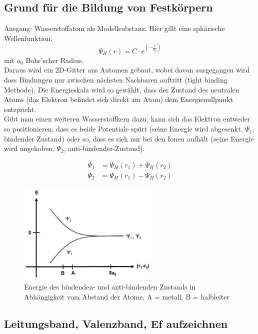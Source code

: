 \documentclass{article}
\begin{document}
\subsection{Grund für die Bildung von Festkörpern }\label{k2:festkorper}
Ausgang: Wasserstoffatom als Modellsubstanz. Hier gillt eine sph\"arische Wellenfunktion:
\begin{equation}
    \Psi_H(r) = C \cdot e^{(-\frac{r}{a_0})}
\end{equation}
mit $a_0$ Bohr'scher Radius.\\
Daraus wird ein 2D-Gitter aus Automen gebaut, wobei davon ausgegangen wird dass Bindungen nur zwischen n\"achsten Nachbaren auftritt (tight binding Methode).
Die Energieskala wird so gew\"ahlt, dass der Zustand des neutralen Atoms (das Elektron befindet sich direkt am Atom) dem Energienullpunkt entspricht.\\
Gibt man einen weiteren Wasserstoffkern dazu, kann sich das Elektron entweder so positionieren, dass es beide Potentiale sp\"urt (seine Energie wird abgesenkt, $\Psi_1$, bindender Zustand) oder so, dass es sich nur bei den Ionen aufhält (seine Energie wird angehoben, $\Psi_2$, anti-bindender-Zustand).
\begin{center}
    \begin{align*}
        \Psi_1 &= \Psi_H(r_1)+\Psi_H(r_2)\\
        \Psi_2 &= \Psi_H(r_1)-\Psi_H(r_2)
    \end{align*}
\end{center}
\begin{figure}[h]
        \centering
        \includegraphics[width=0.6\textwidth]{fig/atomdistanz}
        \caption{Energie des bindenden- und anti-bindenden Zustands in Abh\"angigkeit vom Abstand der Atome. A = metall, B = halbleiter}
        \label{fig:atomdistanz}
\end{figure}
\subsection{Leitungsband, Valenzband, Ef aufzeichnen }\label{k2:leitungsBand}
\end{document}
